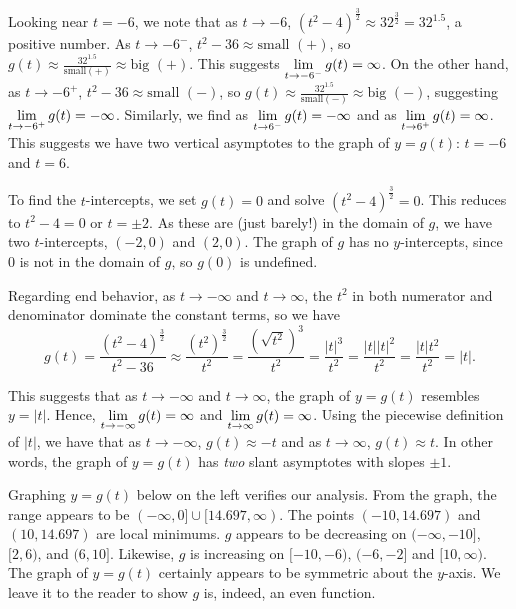 \documentclass{ximera}
\begin{document}
\begin{example}
\begin{enumerate}
Looking near $t = -6$, we note that as $t \rightarrow -6$, $(t^2-4)^{\frac{3}{2}} \approx 32^{\frac{3}{2}} = 32^{1.5}$, a positive number.  As $t \rightarrow -6^{-}$, $t^2-36 \approx \text{small $(+)$}$, so $g(t) \approx \frac{32^{1.5}}{\text{small$(+)$}} \approx \text{big $(+)$}$.  This suggests $\ds{\lim_{t \rightarrow -6^{-}} g(t) =\infty}$.  On the other hand, as $t \rightarrow -6^{+}$, $t^2 -36 \approx \text{small $(-)$}$, so $g(t) \approx \frac{32^{1.5}}{\text{small$(-)$}} \approx \text{big $(-)$}$, suggesting$\ds{\lim_{t \rightarrow -6^{+}} g(t) = -\infty}$. Similarly, we find as  $\ds{\lim_{t \rightarrow 6^{-}} g(t) = -\infty}$ and as  $\ds{\lim_{t \rightarrow 6^{+}} g(t) = \infty}$.  This suggests we have two vertical asymptotes to the graph of $y = g(t)$:  $t = -6$ and $t = 6$.

To find the $t$-intercepts, we set $g(t) = 0$ and solve $(t^2-4)^{\frac{3}{2}} = 0$. This reduces to $t^2-4 =0$ or $t = \pm 2$.  As these are (just barely!) in the domain of $g$, we have two $t$-intercepts, $(-2,0)$ and $(2,0)$.  The graph of $g$ has no $y$-intercepts, since $0$ is not in the domain of $g$, so $g(0)$ is undefined.

Regarding end behavior, as $t \rightarrow  -\infty$ and $t \rightarrow  \infty$, the $t^2$ in both numerator and denominator dominate the constant terms, so we have \[ g(t) =  \dfrac{ (t^2-4)^{\frac{3}{2}} }{t^2-36} \approx  \dfrac{\left(t^2\right)^{\frac{3}{2}}}{t^2} = \dfrac{\left(\sqrt{t^2} \right)^3}{t^2} = \dfrac{|t|^3}{t^2} = \dfrac{|t| |t|^2}{t^2} = \dfrac{|t| t^2}{t^2} = |t|. \]


This suggests that as $t \rightarrow -\infty$ and $t \rightarrow  \infty$, the graph of $y = g(t)$ resembles $y = |t|$.  Hence, $\ds{\lim_{t \rightarrow   -\infty} g(t) = \infty}$ and $\ds{\lim_{t \rightarrow   \infty} g(t) = \infty}$.  Using the piecewise definition of $|t|$, we have that as $t \rightarrow -\infty$, $g(t) \approx -t$ and as $t \rightarrow \infty$, $g(t) \approx t$.  In other words, the graph of  $y = g(t)$ has \textit{two} slant asymptotes with slopes $\pm 1$. 

Graphing $y=g(t)$ below on the left verifies our analysis.  From the graph, the range appears to be $(-\infty, 0] \cup [14.697, \infty)$.  The points $(-10, 14.697)$ and $(10, 14.697)$ are local minimums.  $g$ appears to be decreasing on  $(-\infty, -10]$, $[2, 6)$, and $(6, 10]$. Likewise, $g$ is increasing on $[-10, -6)$, $(-6, -2]$ and $[10, \infty)$.  The graph of $y=g(t)$ certainly appears to be symmetric about the $y$-axis.  We leave it to the reader to show $g$ is, indeed, an even function.


\end{enumerate}
\end{example}
\end{document}
